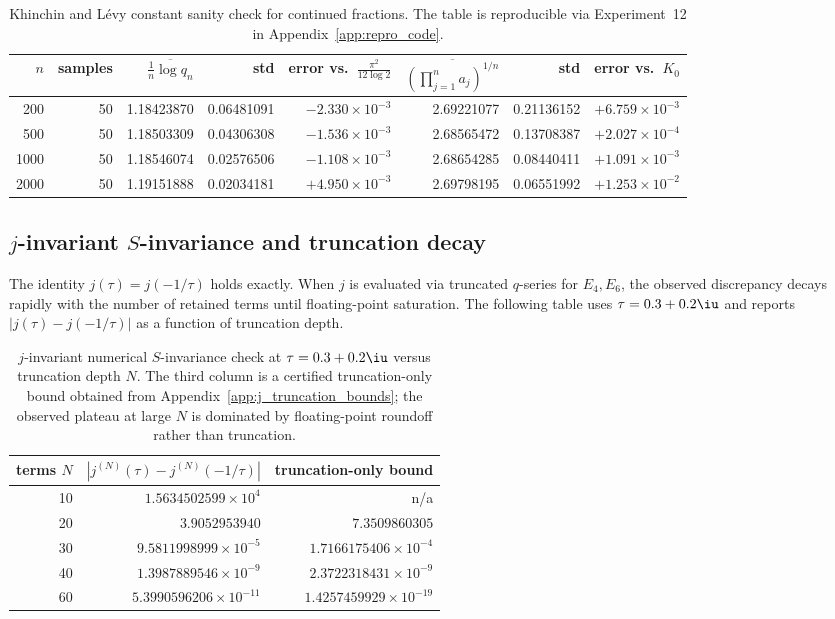 \begin{table}[H]
\centering
\begin{tabular}{rrrrrrrr}
\toprule
$n$ & samples & $\overline{\frac{1}{n}\log q_n}$ & std & error vs.\ $\frac{\pi^2}{12\log 2}$ & $\overline{\left(\prod_{j=1}^n a_j\right)^{1/n}}$ & std & error vs.\ $K_0$ \\
\midrule
200  & 50 & 1.18423870 & 0.06481091 & $-2.330\times 10^{-3}$ & 2.69221077 & 0.21136152 & $+6.759\times 10^{-3}$ \\
500  & 50 & 1.18503309 & 0.04306308 & $-1.536\times 10^{-3}$ & 2.68565472 & 0.13708387 & $+2.027\times 10^{-4}$ \\
1000 & 50 & 1.18546074 & 0.02576506 & $-1.108\times 10^{-3}$ & 2.68654285 & 0.08440411 & $+1.091\times 10^{-3}$ \\
2000 & 50 & 1.19151888 & 0.02034181 & $+4.950\times 10^{-3}$ & 2.69798195 & 0.06551992 & $+1.253\times 10^{-2}$ \\
\bottomrule
\end{tabular}
\caption{Khinchin and L\'evy constant sanity check for continued fractions. The table is reproducible via Experiment~12 in Appendix~\ref{app:repro_code}.}
\label{tab:khinchin_levy_fit}
\end{table}

\subsection{\texorpdfstring{$j$}{j}-invariant \texorpdfstring{$S$}{S}-invariance and truncation decay}
\label{app:quant_fits_j}

The identity $j(\tau)=j(-1/\tau)$ holds exactly. When $j$ is evaluated via truncated $q$-series for $E_4,E_6$, the observed discrepancy decays rapidly with the number of retained terms until floating-point saturation. The following table uses $\tau=0.3+0.2\iu$ and reports $|j(\tau)-j(-1/\tau)|$ as a function of truncation depth.

\begin{table}[H]
\centering
\begin{tabular}{rrr}
\toprule
terms $N$ & $|j^{(N)}(\tau)-j^{(N)}(-1/\tau)|$ & truncation-only bound \\
\midrule
10  & $1.5634502599\times 10^{4}$ & n/a \\
20  & $3.9052953940$              & $7.3509860305$ \\
30  & $9.5811998999\times 10^{-5}$ & $1.7166175406\times 10^{-4}$ \\
40  & $1.3987889546\times 10^{-9}$ & $2.3722318431\times 10^{-9}$ \\
60  & $5.3990596206\times 10^{-11}$ & $1.4257459929\times 10^{-19}$ \\
\bottomrule
\end{tabular}
\caption{$j$-invariant numerical $S$-invariance check at $\tau=0.3+0.2\iu$ versus truncation depth $N$. The third column is a certified truncation-only bound obtained from Appendix~\ref{app:j_truncation_bounds}; the observed plateau at large $N$ is dominated by floating-point roundoff rather than truncation.}
\label{tab:j_invariant_truncation}
\end{table}


